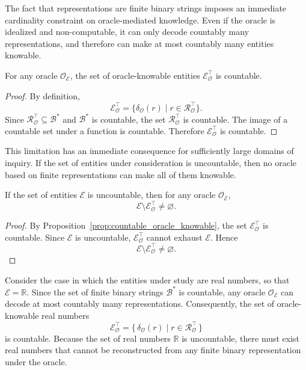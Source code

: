 The fact that representations are finite binary strings imposes an immediate cardinality constraint on oracle-mediated knowledge. Even if the oracle is idealized and non-computable, it can only decode countably many representations, and therefore can make at most countably many entities knowable.

\begin{proposition}
\label{prop:countable_oracle_knowable}
For any oracle \(\mathcal{O}_{\mathcal E}\), the set of oracle-knowable entities \(\mathcal{E}_{\mathcal O}^{\top}\) is countable.
\end{proposition}
\begin{proof}
By definition,
\[
\mathcal{E}_{\mathcal O}^{\top}
=
\{\delta_{\mathcal O}(r)\mid r\in\mathcal{R}_{\mathcal O}^{\top}\}.
\]
Since \(\mathcal{R}_{\mathcal O}^{\top}\subseteq\mathcal{B}^\ast\) and \(\mathcal{B}^\ast\) is countable, the set \(\mathcal{R}_{\mathcal O}^{\top}\) is countable. The image of a countable set under a function is countable. Therefore \(\mathcal{E}_{\mathcal O}^{\top}\) is countable.
\end{proof}

This limitation has an immediate consequence for sufficiently large domains of inquiry. If the set of entities under consideration is uncountable, then no oracle based on finite representations can make all of them knowable.

\begin{proposition}
\label{prop:uncountable_entities_unknowable}
If the set of entities \(\mathcal{E}\) is uncountable, then for any oracle \(\mathcal{O}_{\mathcal E}\),
\[
\mathcal E\setminus \mathcal{E}_{\mathcal O}^{\top}\neq\varnothing.
\]
\end{proposition}
\begin{proof}
By Proposition~\ref{prop:countable_oracle_knowable}, the set \(\mathcal{E}_{\mathcal O}^{\top}\) is countable. Since \(\mathcal E\) is uncountable, \(\mathcal{E}_{\mathcal O}^{\top}\) cannot exhaust \(\mathcal E\). Hence
\[
\mathcal E\setminus \mathcal{E}_{\mathcal O}^{\top}\neq\varnothing.
\]
\end{proof}

\begin{example}
\label{ex:unknowability_real_numbers}
Consider the case in which the entities under study are real numbers, so that \(\mathcal{E}=\mathbb{R}\).
Since the set of finite binary strings \(\mathcal{B}^\ast\) is countable, any oracle \(\mathcal{O}_{\mathcal{E}}\) can decode at most countably many representations. Consequently, the set of oracle-knowable real numbers
\[
\mathcal{E}_{\mathcal{O}}^{\top}
=
\{\,\delta_{\mathcal O}(r)\mid r\in\mathcal{R}_{\mathcal O}^{\top}\,\}
\]
is countable. Because the set of real numbers \(\mathbb{R}\) is uncountable, there must exist real numbers that cannot be reconstructed from any finite binary representation under the oracle.
\end{example}

